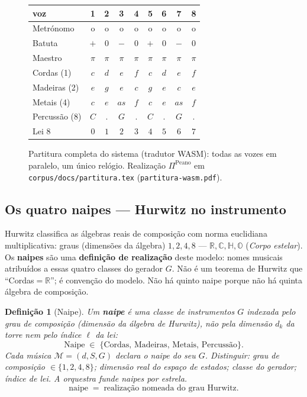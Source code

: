\documentclass[11pt,a4paper]{article}
\newtheorem{definicao}{Definição}
\newcommand{\code}[1]{\texttt{#1}}
\begin{document}
\begin{figure}[ht]
\centering
\begin{center}\small
\begin{tabular}{@{}lcccccccc@{}}
voz & 1 & 2 & 3 & 4 & 5 & 6 & 7 & 8 \\
\midrule
Metrónomo & o & o & o & o & o & o & o & o \\
Batuta & $+$ & $0$ & $-$ & $0$ & $+$ & $0$ & $-$ & $0$ \\
Maestro & $\pi$ & $\pi$ & $\pi$ & $\pi$ & $\pi$ & $\pi$ & $\pi$ & $\pi$ \\
Cordas (1) & $c$ & $d$ & $e$ & $f$ & $c$ & $d$ & $e$ & $f$ \\
Madeiras (2) & $e$ & $g$ & $e$ & $c$ & $g$ & $e$ & $c$ & $e$ \\
Metais (4) & $c$ & $e$ & $as$ & $f$ & $c$ & $e$ & $as$ & $f$ \\
Percussão (8) & $C$ & . & $G$ & . & $C$ & . & $G$ & . \\
Lei 8 & $0$ & $1$ & $2$ & $3$ & $4$ & $5$ & $6$ & $7$ \\
\bottomrule
\end{tabular}
\end{center}
\caption{Partitura completa do sistema (tradutor WASM): todas as vozes em
paralelo, um único relógio. Realização
$\Pi^{\mathrm{Peano}}$ em \code{corpus/docs/partitura.tex}
(\code{partitura-wasm.pdf}).}
\label{fig:partitura-sistema}
\end{figure}

\subsection*{Os quatro naipes --- Hurwitz no instrumento}

Hurwitz classifica as álgebras reais de composição com norma
euclidiana multiplicativa: graus (dimensões da álgebra)
$1,2,4,8$ --- $\mathbb{R},\mathbb{C},\mathbb{H},\mathbb{O}$
(\emph{Corpo estelar}). Os \textbf{naipes} são uma
\textbf{definição de realização} deste modelo: nomes musicais
atribuídos a essas quatro classes do gerador $G$. Não é um teorema de
Hurwitz que ``Cordas$=\mathbb{R}$''; é convenção do modelo. Não há
quinto naipe porque não há quinta álgebra de composição.

\begin{definicao}[Naipe]\label{def:naipe}
Um \textbf{naipe} é uma classe de instrumentos $G$ indexada pelo
\emph{grau de composição} (dimensão da álgebra de Hurwitz), não pela
dimensão $d_k$ da torre nem pelo índice $\ell$ da lei:
\[
\mathrm{Naipe}\;\in\;\{\text{Cordas},\,\text{Madeiras},\,\text{Metais},\,\text{Percussão}\}.
\]
Cada música $\mathcal{M}=(d,S,G)$ declara o naipe do seu $G$. Distinguir:
grau de composição $\in\{1,2,4,8\}$; dimensão real do espaço de estados;
classe do gerador; índice de lei. A orquestra funde naipes por estrela.
\[
\boxed{\text{naipe}\;=\;\text{realização nomeada do grau Hurwitz}.}
\]
\end{definicao}
\end{document}
